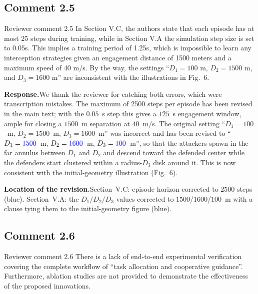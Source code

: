 \documentclass[11pt]{article}
\newcommand{\hladd}[1]{{\color{addblue}#1}}
\newcommand{\rsp}{\medskip\noindent\textbf{Response.}\quad}
\newcommand{\loc}{\medskip\noindent\textbf{Location of the revision.}\quad}
\begin{document}
\subsection*{Comment 2.5 }

\begin{reviewercomment}{Reviewer comment 2.5}
In Section V.C, the authors state that each episode has at most 25 steps during
training, while in Section V.A the simulation step size is set to 0.05s. This implies
a training period of 1.25s, which is impossible to learn any interception strategies
given an engagement distance of 1500 meters and a maximum speed of 40 m/s. By the way,
the settings ``$D_1 = 100$ m, $D_2 = 1500$ m, and $D_3 = 1600$ m'' are inconsistent with
the illustrations in Fig.~6.
\end{reviewercomment}

\rsp We thank the reviewer for catching both errors, which were transcription
mistakes. The maximum of \hladd{2500} steps per episode has been revised in the main
text; with the $0.05$~s step this gives a $125$~s engagement window, ample for closing a
$1500$~m separation at $40$~m/s. The original setting ``$D_1=100$~m, $D_2=1500$~m,
$D_3=1600$~m'' was incorrect and has been revised to ``$D_1=\hladd{1500}$~m,
$D_2=\hladd{1600}$~m, $D_3=\hladd{100}$~m'', so that the attackers spawn in the far
annulus between $D_1$ and $D_2$ and descend toward the defended center while the
defenders start clustered within a radius-$D_3$ disk around it. This is now consistent
with the initial-geometry illustration (Fig.~6).

\loc Section~V.C: episode horizon corrected to $2500$ steps (blue). Section~V.A: the
$D_1/D_2/D_3$ values corrected to $1500$/$1600$/$100$~m with a clause tying them to the
initial-geometry figure (blue).


\subsection*{Comment 2.6}

\begin{reviewercomment}{Reviewer comment 2.6}
There is a lack of end-to-end experimental verification covering the complete workflow of
``task allocation and cooperative guidance''. Furthermore, ablation studies are not provided
to demonstrate the effectiveness of the proposed innovations.
\end{reviewercomment}
\end{document}
